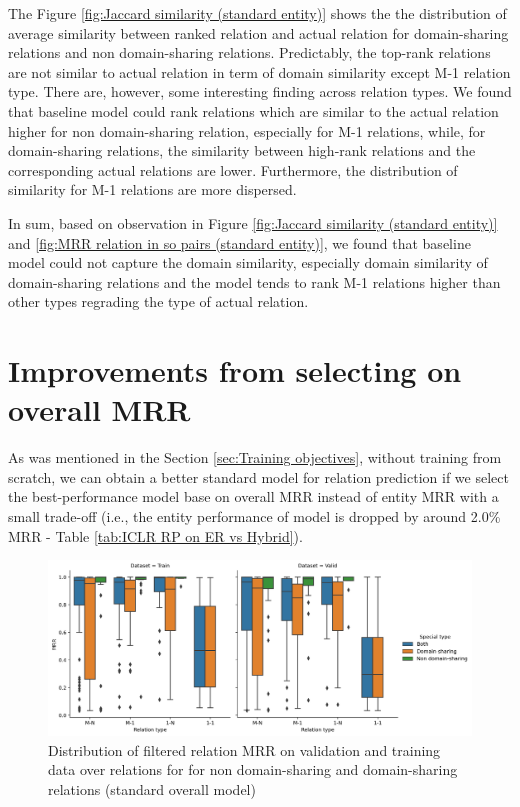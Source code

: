 The Figure \ref{fig:Jaccard similarity (standard entity)} shows the the distribution of average similarity between ranked relation and actual relation for domain-sharing relations and non domain-sharing relations.
Predictably, the top-rank relations are not similar to actual relation in term of domain similarity except M-1 relation type. There are, however, some interesting finding across relation types. We found that baseline model could rank relations which are similar to the actual relation higher for non domain-sharing relation, especially for M-1 relations, while, for domain-sharing relations, the similarity between high-rank relations and the corresponding actual relations are lower. Furthermore, the distribution of similarity for M-1 relations are more dispersed.

In sum, based on observation in Figure \ref{fig:Jaccard similarity (standard entity)} and \ref{fig:MRR relation in so pairs (standard entity)}, we found that baseline model could not capture the domain similarity, especially domain similarity of domain-sharing relations and the model tends to rank M-1 relations higher than other types regrading the type of actual relation. 

\section{Improvements from selecting on overall MRR}

As was mentioned in the Section \ref{sec:Training objectives}, without training from scratch, we can obtain a better standard model for relation prediction if we select the best-performance model base on overall MRR instead of entity MRR with a small trade-off (i.e., the entity performance of model is dropped by around 2.0\% MRR - Table \ref{tab:ICLR RP on ER vs Hybrid}). 


\begin{figure}[!htbp]
	\begin{center}
	\includegraphics[width=\linewidth]{Images/MRR_relation_in_so_pairs (standard overall).png}
	\caption[Distribution of filtered relation MRR (standard overall)]{Distribution of filtered relation MRR on validation and training data over relations for for non domain-sharing and domain-sharing relations (standard overall model)}
	\label{fig:MRR relation in so pairs (standard overall)}
	\end{center}
\end{figure}

